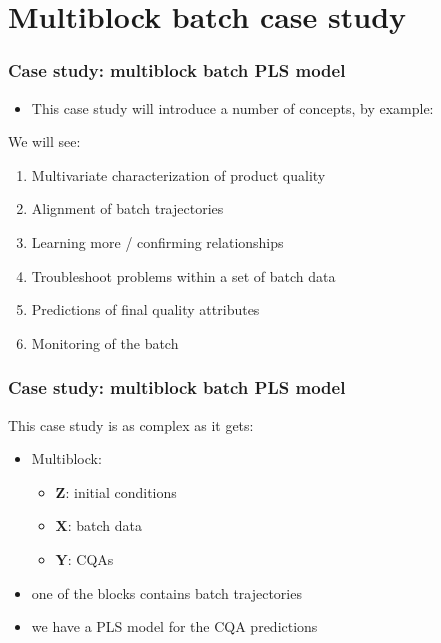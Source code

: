 
\section{Multiblock batch case study}

\begin{frame}\frametitle{Case study: multiblock batch PLS model}

\begin{itemize}
	\item	This case study will introduce a number of concepts, by example:
\end{itemize}

We will see:
\begin{enumerate}

	\item	Multivariate characterization of product quality
		
	\item	Alignment of batch trajectories
	
	\item 	Learning more / confirming relationships
	
	\item 	Troubleshoot problems within a set of batch data
	
	\item 	Predictions of final quality attributes
	
	\item 	Monitoring of the batch
	
\end{enumerate} \pause
\end{frame}

\begin{frame}\frametitle{Case study: multiblock batch PLS model}
	
This case study is as complex as it gets: 

\begin{itemize}
	\item	Multiblock: 
	
		\begin{itemize}
			\item	\( \mathbf{Z} \): initial conditions
			
			\item	\( \mathbf{X} \): batch data
			
			\item	\( \mathbf{Y} \): CQAs
			
		\end{itemize}
		
	\item 	one of the blocks contains batch trajectories
	
	\item	we have a PLS model for the CQA predictions
\end{itemize}

\end{frame}

